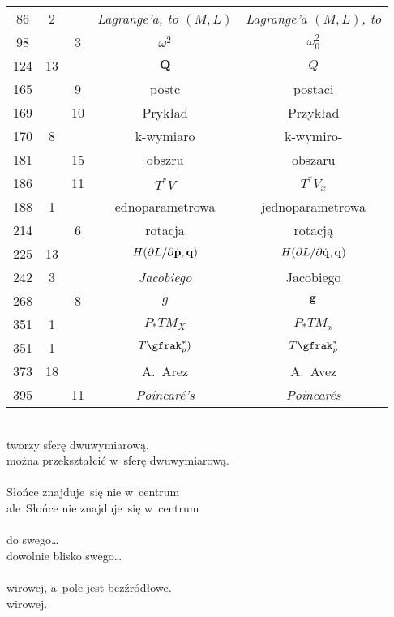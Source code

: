 \documentclass[a4paper,11pt]{article}
\begin{document}
\begin{center}
\begin{tabular}{|c|c|c|c|c|}
    86  &  2 & & \textit{Lagrange’a, to $( M, L )$}
           & \textit{Lagrange’a $( M, L )$, to} \\
    98  & &  3 & $\omega^{ 2 }$ & $\omega_{ 0 }^{ 2 }$ \\
    124 & 13 & & $\mathbf{Q}$ & $Q$ \\
    165 & &  9 & postc & postaci \\
    169 & & 10 & Prykład & Przykład \\
    170 & 8 & & k-wymiaro & k-wymiro- \\
    181 & & 15 & obszru & obszaru \\
    186 & & 11 & $T^{ * } V$ & $T^{ * } V_{ x }$ \\
    188 & 1 & & ednoparametrowa & jednoparametrowa \\
    214 & & 6 & rotacja & rotacją \\
    225 & 13 & & $H( \partial L / \partial \dot{ \mathbf{p} }, \mathbf{q} )$
           & $H( \partial L / \partial \dot{ \mathbf{q} }, \mathbf{q} )$ \\
    242 &  3 & & \textit{Jacobiego} & Jacobiego \\
    268 & &  8 & $g$ & $\mathbf{g}$ \\
    351 &  1 & & $P_{ * }TM_{ X }$ & $P_{ * }TM_{ x }$ \\
    351 &  1 & & $T\gfrak_{ p }^{ * })$ & $T\gfrak_{ p }^{ * }$ \\
    373 & 18 & & A.~Arez & A.~Avez \\
    395 & & 11 & \textit{Poincar\'{e}'s} & \textit{Poincar\'{e}s} \\
    \hline
  \end{tabular}

\end{center}


\noindent
{} \\
\Jest  tworzy sferę dwuwymiarową. \\
\Powin można przekształcić w~sferę dwuwymiarową. \\
 \\
\Jest  Słońce znajduje~się nie w~centrum \\
\Powin ale~Słońce nie znajduje~się w~centrum \\
 \\
\Jest  do swego\ldots \\
\Powin dowolnie blisko swego\ldots \\
 \\
\Jest  wirowej, a~pole jest bezźródłowe. \\
\Powin wirowej. \\
\end{document}
